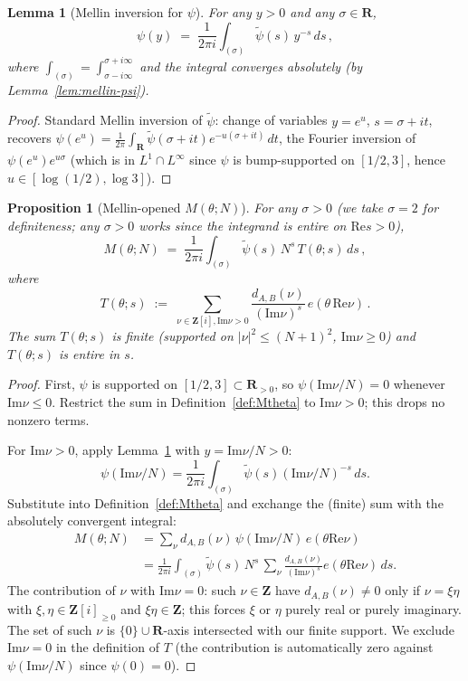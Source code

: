 \documentclass[11pt]{article}
\newtheorem{lemma}[theorem]{Lemma}
\newtheorem{proposition}[theorem]{Proposition}
\theoremstyle{definition}
\newcommand{\Z}{\mathbf{Z}}
\newcommand{\R}{\mathbf{R}}
\newcommand{\Zi}{\Z[i]}
\renewcommand{\Re}{\mathrm{Re}}
\renewcommand{\Im}{\mathrm{Im}}
\begin{document}
\begin{lemma}[Mellin inversion for $\psi$]\label{lem:mellin-inversion}
For any $y>0$ and any $\sigma\in\R$,
\[
   \psi(y)\;=\;\frac{1}{2\pi i}\int_{(\sigma)}\widetilde\psi(s)\,y^{-s}\,ds\,,
\]
where $\int_{(\sigma)}=\int_{\sigma-i\infty}^{\sigma+i\infty}$ and the integral converges absolutely (by Lemma~\ref{lem:mellin-psi}).
\end{lemma}

\begin{proof}
Standard Mellin inversion of $\widetilde\psi$: change of variables $y=e^u$, $s=\sigma+it$, recovers $\psi(e^u)=\frac{1}{2\pi}\int_\R\widetilde\psi(\sigma+it)e^{-u(\sigma+it)}\,dt$, the Fourier inversion of $\psi(e^u)e^{u\sigma}$ (which is in $L^1\cap L^\infty$ since $\psi$ is bump-supported on $[1/2,3]$, hence $u\in[\log(1/2),\log 3]$).
\end{proof}

\begin{proposition}[Mellin-opened $M(\theta;N)$]\label{prop:M-mellin}
For any $\sigma>0$ (we take $\sigma=2$ for definiteness; any $\sigma>0$ works since the integrand is entire on $\Re s>0$),
\[
   M(\theta;N)\;=\;\frac{1}{2\pi i}\int_{(\sigma)}\widetilde\psi(s)\,N^s\,T(\theta;s)\,ds\,,
\]
where
\[
   T(\theta;s)\;:=\;\sum_{\nu\in\Zi,\Im\nu>0}\frac{d_{A,B}(\nu)}{(\Im\nu)^s}\,e(\theta\,\Re\nu)\,.
\]
The sum $T(\theta;s)$ is finite (supported on $|\nu|^2\le(N+1)^2$, $\Im\nu\ge 0$) and $T(\theta;s)$ is entire in $s$.
\end{proposition}

\begin{proof}
First, $\psi$ is supported on $[1/2,3]\subset\R_{>0}$, so $\psi(\Im\nu/N)=0$ whenever $\Im\nu\le 0$. Restrict the sum in Definition~\ref{def:Mtheta} to $\Im\nu>0$; this drops no nonzero terms.

For $\Im\nu>0$, apply Lemma~\ref{lem:mellin-inversion} with $y=\Im\nu/N>0$:
\[
   \psi(\Im\nu/N)=\frac{1}{2\pi i}\int_{(\sigma)}\widetilde\psi(s)(\Im\nu/N)^{-s}\,ds.
\]
Substitute into Definition~\ref{def:Mtheta} and exchange the (finite) sum with the absolutely convergent integral:
\begin{align*}
   M(\theta;N)&=\sum_\nu d_{A,B}(\nu)\,\psi(\Im\nu/N)\,e(\theta\Re\nu)\\
   &=\frac{1}{2\pi i}\int_{(\sigma)}\widetilde\psi(s)\,N^s\,\sum_\nu\frac{d_{A,B}(\nu)}{(\Im\nu)^s}e(\theta\Re\nu)\,ds.
\end{align*}
The contribution of $\nu$ with $\Im\nu=0$: such $\nu\in\Z$ have $d_{A,B}(\nu)\ne 0$ only if $\nu=ξ\eta$ with $\xi,\eta\in\Zi_{\ge 0}$ and $\xi\eta\in\Z$; this forces $\xi$ or $\eta$ purely real or purely imaginary. The set of such $\nu$ is $\{0\}\cup\R$-axis intersected with our finite support. We exclude $\Im\nu=0$ in the definition of $T$ (the contribution is automatically zero against $\psi(\Im\nu/N)$ since $\psi(0)=0$).
\end{proof}
\end{document}
